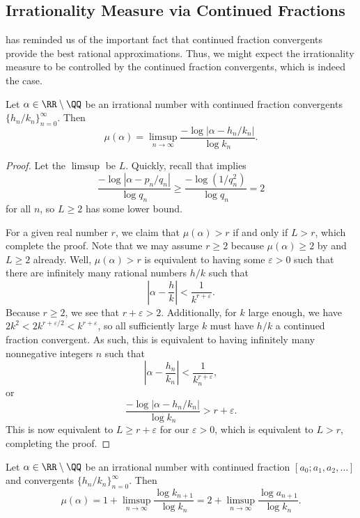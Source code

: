 \documentclass[../notes.tex]{subfiles}
\begin{document}
\subsection{Irrationality Measure via Continued Fractions}
 has reminded us of the important fact that continued fraction convergents provide the best rational approximations. Thus, we might expect the irrationality measure to be controlled by the continued fraction convergents, which is indeed the case.
\begin{lemma} \label{lem:mu-by-convergents}
	Let $\alpha\in\RR\setminus\QQ$ be an irrational number with continued fraction convergents $\{h_n/k_n\}_{n=0}^\infty$. Then
	\[\mu(\alpha)=\limsup_{n\to\infty}\frac{-\log\left|\alpha-h_n/k_n\right|}{\log k_n}.\]
\end{lemma}
\begin{proof}
	Let the $\limsup$ be $L$. Quickly, recall that  implies
	\[\frac{-\log\left|\alpha-p_n/q_n\right|}{\log q_n}\ge\frac{-\log\left(1/q_n^2\right)}{\log q_n}=2\]
	for all $n$, so $L\ge2$ has some lower bound.

	For a given real number $r$, we claim that $\mu(\alpha)>r$ if and only if $L>r$, which complete the proof. Note that we may assume $r\ge2$ because $\mu(\alpha)\ge2$ by  and $L\ge2$ already. Well, $\mu(\alpha)>r$ is equivalent to having some $\varepsilon>0$ such that there are infinitely many rational numbers $h/k$ such that
	\[\left|\alpha-\frac hk\right|<\frac1{k^{r+\varepsilon}}.\]
	Because $r\ge2$, we see that $r+\varepsilon>2$. Additionally, for $k$ large enough, we have $2k^2<2k^{r+\varepsilon/2}<k^{r+\varepsilon}$, so all sufficiently large $k$ must have $h/k$ a continued fraction convergent. As such, this is equivalent to having infinitely many nonnegative integers $n$ such that
	\[\left|\alpha-\frac{h_n}{k_n}\right|<\frac1{k_n^{r+\varepsilon}},\]
	or
	\[\frac{-\log\left|\alpha-h_n/k_n\right|}{\log k_n}>r+\varepsilon.\]
	This is now equivalent to $L\ge r+\varepsilon$ for our $\varepsilon>0$, which is equivalent to $L>r$, completing the proof.
\end{proof}
\begin{proposition} \label{prop:mu-by-convergents}
	Let $\alpha\in\RR\setminus\QQ$ be an irrational number with continued fraction $[a_0;a_1,a_2,\ldots]$ and convergents $\{h_n/k_n\}_{n=0}^\infty$. Then
	\[\mu(\alpha)=1+\limsup_{n\to\infty}\frac{\log k_{n+1}}{\log k_n}=2+\limsup_{n\to\infty}\frac{\log a_{n+1}}{\log k_n}.\]
\end{proposition}
\end{document}
